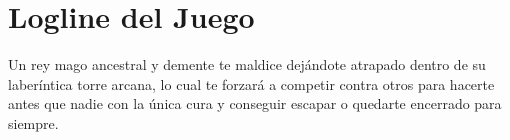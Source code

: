 \section{Logline del Juego}%

Un rey mago ancestral y demente te maldice dejándote atrapado dentro de su
laberíntica torre arcana, lo cual te forzará a competir contra otros para
hacerte antes que nadie con la única cura y conseguir escapar o quedarte
encerrado para siempre.


